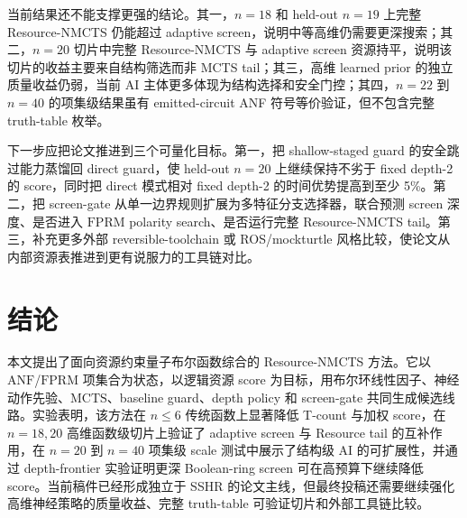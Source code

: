 \documentclass[UTF8,fontset=macnew,11pt]{ctexart}
\newcommand{\method}{Resource-NMCTS}
\newcommand{\anf}{\ensuremath{\mathrm{ANF}}}
\newcommand{\fprm}{\ensuremath{\mathrm{FPRM}}}
\newcommand{\mcts}{\ensuremath{\mathrm{MCTS}}}
\newcommand{\ttable}{truth-table}
\begin{document}
当前结果还不能支撑更强的结论。其一，$n=18$ 和 held-out $n=19$ 上完整 \method{} 仍能超过 adaptive screen，说明中等高维仍需要更深搜索；其二，$n=20$ 切片中完整 \method{} 与 adaptive screen 资源持平，说明该切片的收益主要来自结构筛选而非 MCTS tail；其三，高维 learned prior 的独立质量收益仍弱，当前 AI 主体更多体现为结构选择和安全门控；其四，$n=22$ 到 $n=40$ 的项集级结果虽有 emitted-circuit ANF 符号等价验证，但不包含完整 \ttable{} 枚举。

下一步应把论文推进到三个可量化目标。第一，把 shallow-staged guard 的安全跳过能力蒸馏回 direct guard，使 held-out $n=20$ 上继续保持不劣于 fixed depth-2 的 score，同时把 direct 模式相对 fixed depth-2 的时间优势提高到至少 5\%。第二，把 screen-gate 从单一边界规则扩展为多特征分支选择器，联合预测 screen 深度、是否进入 \fprm{} polarity search、是否运行完整 \method{} tail。第三，补充更多外部 reversible-toolchain 或 ROS/mockturtle 风格比较，使论文从内部资源表推进到更有说服力的工具链对比。

\section{结论}

本文提出了面向资源约束量子布尔函数综合的 \method{} 方法。它以 \anf{}/\fprm{} 项集合为状态，以逻辑资源 score 为目标，用布尔环线性因子、神经动作先验、\mcts{}、baseline guard、depth policy 和 screen-gate 共同生成候选线路。实验表明，该方法在 $n\leq6$ 传统函数上显著降低 T-count 与加权 score，在 $n=18,20$ 高维函数级切片上验证了 adaptive screen 与 Resource tail 的互补作用，在 $n=20$ 到 $n=40$ 项集级 scale 测试中展示了结构级 AI 的可扩展性，并通过 depth-frontier 实验证明更深 Boolean-ring screen 可在高预算下继续降低 score。当前稿件已经形成独立于 SSHR 的论文主线，但最终投稿还需要继续强化高维神经策略的质量收益、完整 \ttable{} 可验证切片和外部工具链比较。
\end{document}
